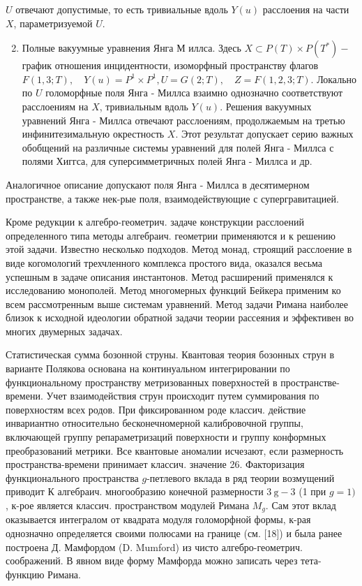 \documentclass[10pt]{article}
\begin{document}
$U$ отвечают допустимые, то есть тривиальные вдоль $Y(u)$ расслоения на части $X$, параметризуемой $U$.



\begin{enumerate}

  \setcounter{enumi}{1}

  \item Полные вакуумные уравнения Янга М иллса. Здесь $X \subset P(T) \times P\left(T^{*}\right)-$ график отношения инцидентности, изоморфный пространству флагов $F(1,3 ; T), \quad Y(u)=P^{1} \times P^{1}, U=G(2 ; T), \quad Z=F(1,2,3 ; T)$. Локально по $U$ голоморфные поля Янга - Миллса взаимно однозначно соответствуют расслоениям на $X$, тривиальным вдоль $Y(u)$. Решения вакуумных уравнений Янга - Миллса отвечают расслоениям, продолжаемым на третью инфинитезимальную окрестность $X$. Этот результат допускает серию важных обобщений на различные системы уравнений для полей Янга - Миллса с полями Хиггса, для суперсимметричных полей Янга - Миллса и др.

\end{enumerate}



Аналогичное описание допускают поля Янга - Миллса в десятимерном пространстве, а также нек-рые поля, взаимодействующие с супергравитацией.



Кроме редукции к алгебро-геометрич. задаче конструкции расслоений определенного типа методы алгебраич. геометрии применяются и к решению этой задачи. Известно несколько подходов. Метод монад, строящий расслоение в виде когомологий трехчленного комплекса простого вида, оказался весьма успешным в задаче описания инстантонов. Метод расширений применялся к исследованию монополей. Метод многомерных функций Бейкера применим ко всем рассмотренным выше системам уравнений. Метод задачи Римана наиболее близок к исходной идеологии обратной задачи теории рассеяния и эффективен во многих двумерных задачах.



Статистическая сумма бозонной струны. Квантовая теория бозонных струн в варианте Полякова основана на континуальном интегрировании по функциональному пространству метризованных поверхностей в пространстве-времени. Учет взаимодействия струн происходит путем суммирования по поверхностям всех родов. При фиксированном роде классич. действие инвариантно относительно бесконечномерной калибровочной группы, включающей группу репараметризаций поверхности и группу конформных преобразований метрики. Все квантовые аномалии исчезают, если размерность пространства-времени принимает классич. значение 26. Факторизация функционального пространства $g$-петлевого вклада в ряд теории возмущений приводит К алгебраич. многообразию конечной размерности $3 \mathrm{~g}-3$ (1 при $g=1)$, к-рое является классич. пространством модулей Римана $M_{g}$. Сам этот вклад оказывается интегралом от квадрата модуля голоморфной формы, к-рая однозначно определяется своими полюсами на границе (см. [18]) и была ранее построена Д. Мамфордом (D. Mumford) из чисто алгебро-геометрич. соображений. В явном виде форму Мамфорда можно записать через тета-функцию Римана.
\end{document}
